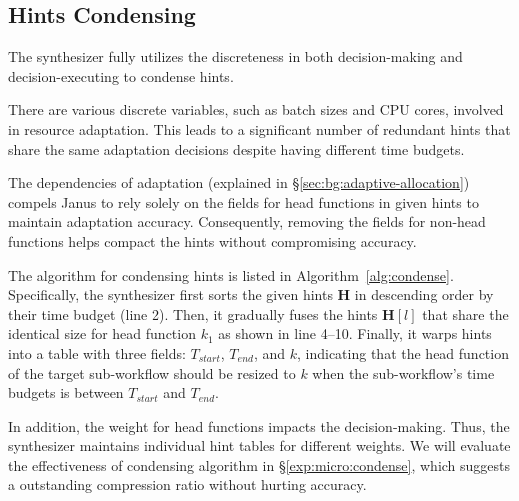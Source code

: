 \subsection{Hints Condensing}
\label{sec:synthesizer:condense}
The synthesizer fully utilizes the discreteness in both decision-making and decision-executing to condense hints.

 There are various discrete variables, such as batch sizes and CPU cores, involved in resource adaptation. 
This leads to a significant number of redundant hints that share the same adaptation decisions despite having different time budgets.

The dependencies of adaptation (explained in \S\ref{sec:bg:adaptive-allocation}) compels Janus to rely solely on the fields for head functions in given hints to maintain adaptation accuracy.
Consequently, removing the fields for non-head functions helps compact the hints without compromising accuracy.
 
The algorithm for condensing hints is listed in Algorithm~\ref{alg:condense}.
Specifically, the synthesizer first sorts the given hints $\mathbf{H}$ in descending order by their time budget (line 2).
Then, it gradually fuses the hints $\mathbf{H}[l]$ that share the identical size for head function $k_1$ as shown in line 4--10.
Finally, it warps hints into a table with three fields: $T_{start}$, $T_{end}$, and $k$, indicating that the head function of the target sub-workflow should be resized to $k$ when the sub-workflow's time budgets is between $T_{start}$ and $T_{end}$.
 
 In addition, the weight for head functions impacts the decision-making.
 Thus, the synthesizer maintains individual hint tables for different weights.
 We will evaluate the effectiveness of condensing algorithm in \S\ref{exp:micro:condense}, which suggests a outstanding compression ratio without hurting accuracy. 
 
